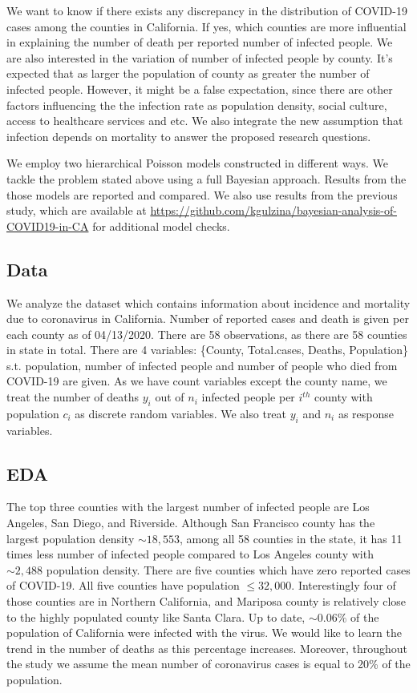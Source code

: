 \documentclass[11pt,twocolumn]{asaproc}
\begin{document}
We want to know if there exists any discrepancy in the distribution of COVID-19 cases among the counties in California. If yes, which counties are more influential in explaining the number of death per reported number of infected people. We are also interested in the variation of number of infected people by county. It's expected that as larger the population of county as greater the number of infected people. However, it might be a false expectation, since there are other factors influencing the the infection rate as population density, social culture, access to healthcare services and etc. We also integrate the new assumption that infection depends on mortality to answer the proposed research questions.

We employ two hierarchical Poisson models constructed in different ways. We tackle the problem stated above using a full Bayesian approach. Results from the those models are reported and compared. We also use results from the previous study, which are available at \url{https://github.com/kgulzina/bayesian-analysis-of-COVID19-in-CA} for additional model checks.



\subsection{Data}

We analyze the dataset which contains information about incidence and mortality due to coronavirus in California. Number of reported cases and death is given per each county as of 04/13/2020. There are 58 observations, as there are 58 counties in state in total. There are 4 variables: \{County, Total.cases, Deaths, Population\} s.t. population, number of infected people and number of people who died from COVID-19 are given. As we have count variables except the county name, we treat the number of deaths $y_i$  out of $n_i$ infected people per $i^{th}$ county with population $c_i$ as discrete random variables. We also treat $y_i$ and $n_i$ as response variables.



\subsection{EDA}
The top three counties with the largest number of infected people are Los Angeles, San Diego, and Riverside.  Although San Francisco county has the largest population density $\sim18,553$, among all 58 counties in the state, it has 11 times less number of infected people compared to Los Angeles county with $\sim2,488$ population density. There are five counties which have zero reported cases of COVID-19. All five counties have population $\leq 32,000$. Interestingly four of those counties are in Northern California, and Mariposa county is relatively close to the highly populated county like Santa Clara. Up to date, $\sim 0.06\%$ of the population of California were infected with the virus. We would like to learn the trend in the number of deaths as this percentage increases. Moreover, throughout the study we assume the mean number of coronavirus cases is equal to 20\% of the population. 
\end{document}
